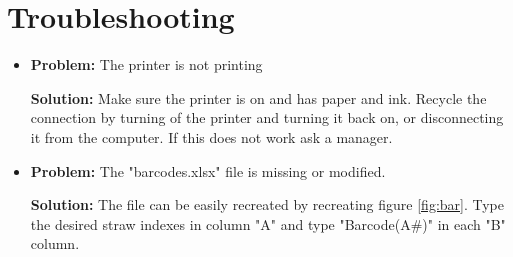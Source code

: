 \documentclass[letterpaper,12pt]{article}
\begin{document}
\section{Troubleshooting}

\begin{itemize}
	\item {\bf Problem:} The printer is not printing
		\begin{adjustwidth}{1cm}{}
		{\bf Solution:} Make sure the printer is on and has paper and ink. Recycle the connection by turning of the printer and turning it back on, or disconnecting it from the computer.  If this does not work ask a manager. 
		\end{adjustwidth}
	\item {\bf Problem:} The "barcodes.xlsx" file is missing or modified.
		\begin{adjustwidth}{1cm}{}
		{\bf Solution:} The file can be easily recreated by recreating figure \ref{fig:bar}.  Type the desired straw indexes in column "A" and type "Barcode(A\#)" in each "B" column. 
		\end{adjustwidth}
	

\end{itemize}
\end{document}
